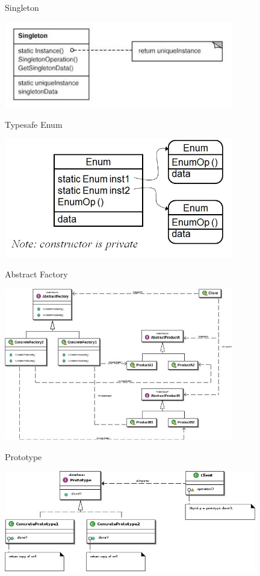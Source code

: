 \begin{frame}{Singleton}
	\begin{center}
		\includegraphics[width=10cm]{pattern_singleton.jpg}
	\end{center}
\end{frame}

\begin{frame}{Typesafe Enum}
	\begin{center}
		\includegraphics[width=10cm]{pattern_typesafe.jpg}
	\end{center}
\end{frame}

\begin{frame}{Abstract Factory}
	\begin{center}
		\includegraphics[width=10cm]{pattern_abstractfactory.jpg}
	\end{center}
\end{frame}

\begin{frame}{Prototype}
	\begin{center}
		\includegraphics[width=11cm]{pattern_prototype.jpg}
	\end{center}
\end{frame}

